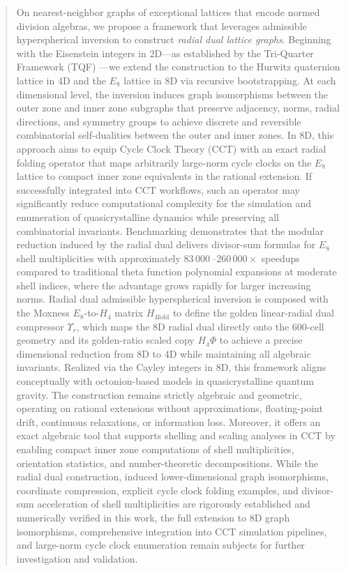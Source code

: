 \documentclass{article}
\begin{document}
\begin{abstract}
On nearest-neighbor graphs of exceptional lattices that encode normed division algebras, we propose a framework that leverages admissible hyperspherical inversion to construct \emph{radial dual lattice graphs}. Beginning with the Eisenstein integers in 2D---as established by the Tri-Quarter Framework (TQF) \cite{Schmidt2025}---we extend the construction to the Hurwitz quaternion lattice in 4D and the $E_8$ lattice in 8D via recursive bootstrapping. At each dimensional level, the inversion induces graph isomorphisms between the outer zone and inner zone subgraphs that preserve adjacency, norms, radial directions, and symmetry groups to achieve discrete and reversible combinatorial self-dualities between the outer and inner zones. In 8D, this approach aims to equip Cycle Clock Theory (CCT) with an exact radial folding operator that maps arbitrarily large-norm cycle clocks on the $E_8$ lattice to compact inner zone equivalents in the rational extension. If successfully integrated into CCT workflows, such an operator may significantly reduce computational complexity for the simulation and enumeration of quasicrystalline dynamics while preserving all combinatorial invariants. Benchmarking demonstrates that the modular reduction induced by the radial dual delivers divisor-sum formulas for $E_8$ shell multiplicities with approximately $83\,000$\,--$260\,000\times$ speedups compared to traditional theta function polynomial expansions at moderate shell indices, where the advantage grows rapidly for larger increasing norms. Radial dual admissible hyperspherical inversion is composed with the Moxness $E_8$-to-$H_4$ matrix $H_{4\mathrm{fold}}$ to define the golden linear-radial dual compressor $\Upsilon_r$, which maps the 8D radial dual directly onto the 600-cell geometry and its golden-ratio scaled copy $H_4\Phi$ to achieve a precise dimensional reduction from 8D to 4D while maintaining all algebraic invariants. Realized via the Cayley integers in 8D, this framework aligns conceptually with octonion-based models in quasicrystalline quantum gravity. The construction remains strictly algebraic and geometric, operating on rational extensions without approximations, floating-point drift, continuous relaxations, or information loss. Moreover, it offers an exact algebraic tool that supports shelling and scaling analyses in CCT by enabling compact inner zone computations of shell multiplicities, orientation statistics, and number-theoretic decompositions. While the radial dual construction, induced lower-dimensional graph isomorphisms, coordinate compression, explicit cycle clock folding examples, and divisor-sum acceleration of shell multiplicities are rigorously established and numerically verified in this work, the full extension to 8D graph isomorphisms, comprehensive integration into CCT simulation pipelines, and large-norm cycle clock enumeration remain subjects for further investigation and validation.
\end{abstract}
\end{document}
